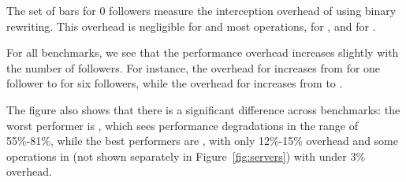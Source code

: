 The set of bars for 0 followers measure the interception overhead
of \nx using binary rewriting.  This overhead is negligible for
\lighttpd and most \redis operations, \nginxIntercept for \nginx, and
\beanstalkdIntercept for \beanstalkd.

For all benchmarks, we see that the performance overhead increases
slightly with the number of followers.  For instance, the overhead for
\beanstalkd increases from \beanstalkdOneFollower for one follower to
\beanstalkdSixFollowers for six followers, while the overhead for
\lighttpd increases from \lighttpdOneFollower to
\lighttpdSixFollowers.

The figure also shows that there is a significant difference across
benchmarks: the worst performer is \beanstalkd, which sees performance
degradations in the range of 55\%-81\%, while the best performers are
\lighttpd, with only 12\%-15\% overhead and some operations in \redis
(not shown separately in Figure~\ref{fig:servers})
with under 3\% overhead.

